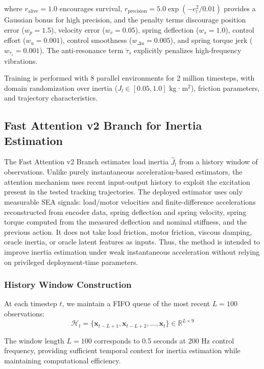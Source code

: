 \documentclass[lettersize,journal]{IEEEtran}
\begin{document}
\noindent where $r_{\text{alive}} = 1.0$ encourages survival, $r_{\text{precision}} = 5.0 \exp(-e_{l}^2 / 0.01)$ provides a Gaussian bonus for high precision, and the penalty terms discourage position error ($w_p = 1.5$), velocity error ($w_v = 0.05$), spring deflection ($w_s = 1.0$), control effort ($w_u = 0.001$), control smoothness ($w_{\Delta u} = 0.005$), and spring torque jerk ($w_{\ddot{\tau}_s} = 0.001$). The anti-resonance term $\ddot{\tau}_s$ explicitly penalizes high-frequency vibrations.

Training is performed with 8 parallel environments for 2 million timesteps, with domain randomization over inertia ($J_l \in [0.05, 1.0]$ kg·m$^2$), friction parameters, and trajectory characteristics.

\subsection{Fast Attention v2 Branch for Inertia Estimation}

The Fast Attention v2 Branch estimates load inertia $\hat{J}_l$ from a history window of observations. Unlike purely instantaneous acceleration-based estimators, the attention mechanism uses recent input-output history to exploit the excitation present in the tested tracking trajectories. The deployed estimator uses only measurable SEA signals: load/motor velocities and finite-difference accelerations reconstructed from encoder data, spring deflection and spring velocity, spring torque computed from the measured deflection and nominal stiffness, and the previous action. It does not take load friction, motor friction, viscous damping, oracle inertia, or oracle latent features as inputs. Thus, the method is intended to improve inertia estimation under weak instantaneous acceleration without relying on privileged deployment-time parameters.

\subsubsection{History Window Construction}

At each timestep $t$, we maintain a FIFO queue of the most recent $L = 100$ observations:
\begin{equation}
\mathcal{H}_t = \{\bm{x}_{t-L+1}, \bm{x}_{t-L+2}, \ldots, \bm{x}_t\} \in \mathbb{R}^{L \times 9} \label{eq:history_window}
\end{equation}

The window length $L = 100$ corresponds to 0.5 seconds at 200 Hz control frequency, providing sufficient temporal context for inertia estimation while maintaining computational efficiency.
\end{document}
